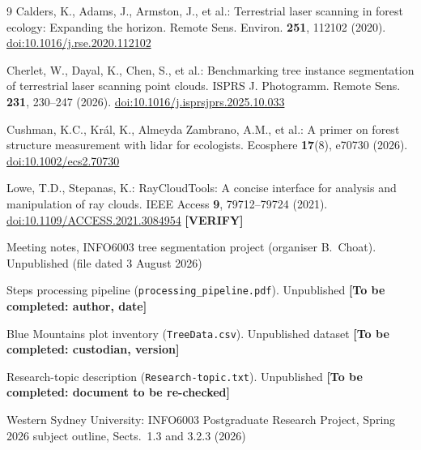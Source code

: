 \documentclass[runningheads]{llncs}
\newcommand{\todo}[1]{\textbf{[To be completed: #1]}}
\newcommand{\verify}{\textbf{[VERIFY]}}
\begin{document}
\begin{thebibliography}{9}
Calders, K., Adams, J., Armston, J., et al.: Terrestrial laser scanning in forest ecology: Expanding the horizon. Remote Sens. Environ. \textbf{251}, 112102 (2020). \href{https://doi.org/10.1016/j.rse.2020.112102}{doi:10.1016/j.rse.2020.112102}

Cherlet, W., Dayal, K., Chen, S., et al.: Benchmarking tree instance segmentation of terrestrial laser scanning point clouds. ISPRS J. Photogramm. Remote Sens. \textbf{231}, 230--247 (2026). \href{https://doi.org/10.1016/j.isprsjprs.2025.10.033}{doi:10.1016/j.isprsjprs.2025.10.033}

Cushman, K.C., Kr\'al, K., Almeyda Zambrano, A.M., et al.: A primer on forest structure measurement with lidar for ecologists. Ecosphere \textbf{17}(8), e70730 (2026). \href{https://doi.org/10.1002/ecs2.70730}{doi:10.1002/ecs2.70730}

Lowe, T.D., Stepanas, K.: RayCloudTools: A concise interface for analysis and manipulation of ray clouds. IEEE Access \textbf{9}, 79712--79724 (2021). \href{https://doi.org/10.1109/ACCESS.2021.3084954}{doi:10.1109/ACCESS.2021.3084954} \verify

Meeting notes, INFO6003 tree segmentation project (organiser B.~Choat). Unpublished (file dated 3 August 2026)

Steps processing pipeline (\nolinkurl{processing_pipeline.pdf}). Unpublished \todo{author, date}

Blue Mountains plot inventory (\nolinkurl{TreeData.csv}). Unpublished dataset \todo{custodian, version}

Research-topic description (\nolinkurl{Research-topic.txt}). Unpublished \todo{document to be re-checked}

Western Sydney University: INFO6003 Postgraduate Research Project, Spring 2026 subject outline, Sects.~1.3 and 3.2.3 (2026)
\end{thebibliography}
\end{document}
